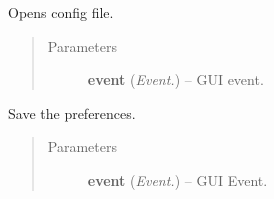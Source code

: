 \documentclass[letterpaper,10pt,english]{sphinxmanual}
\begin{document}
\begin{fulllineitems}
\begin{fulllineitems}
\label{api:wos.PreferencesDialog.openConfig}
Opens config file.
\begin{quote}\begin{description}
\item[{Parameters}] \leavevmode
\textbf{event} (\emph{Event.}) -- GUI event.

\end{description}\end{quote}

\end{fulllineitems}


\begin{fulllineitems}
\label{api:wos.PreferencesDialog.savePreferences}
Save the preferences.
\begin{quote}\begin{description}
\item[{Parameters}] \leavevmode
\textbf{event} (\emph{Event.}) -- GUI Event.

\end{description}\end{quote}

\end{fulllineitems}


\end{fulllineitems}

\end{document}
